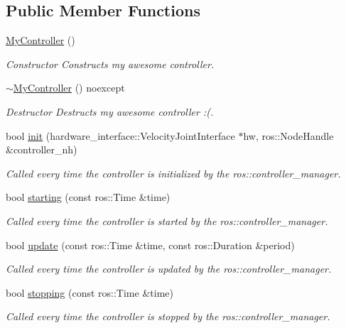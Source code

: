 \subsection*{Public Member Functions}
\begin{DoxyCompactItemize}
\item 
\hypertarget{classmycontroller_1_1MyController_a6f31f5a2318ff9e84accc3e3ce29e897}{\hyperlink{classmycontroller_1_1MyController_a6f31f5a2318ff9e84accc3e3ce29e897}{My\-Controller} ()}\label{classmycontroller_1_1MyController_a6f31f5a2318ff9e84accc3e3ce29e897}

\begin{DoxyCompactList}\small\item\em Constructor Constructs my awesome controller. \end{DoxyCompactList}\item 
\hypertarget{classmycontroller_1_1MyController_a30c609fe8c6f674a1d855bddd107f7f2}{\hyperlink{classmycontroller_1_1MyController_a30c609fe8c6f674a1d855bddd107f7f2}{$\sim$\-My\-Controller} () noexcept}\label{classmycontroller_1_1MyController_a30c609fe8c6f674a1d855bddd107f7f2}

\begin{DoxyCompactList}\small\item\em Destructor Destructs my awesome controller \-:(. \end{DoxyCompactList}\item 
bool \hyperlink{classmycontroller_1_1MyController_af9496597a461ffe70990e4a32a3d1cfd}{init} (hardware\-\_\-interface\-::\-Velocity\-Joint\-Interface $\ast$hw, ros\-::\-Node\-Handle \&controller\-\_\-nh)
\begin{DoxyCompactList}\small\item\em Called every time the controller is initialized by the ros\-::controller\-\_\-manager. \end{DoxyCompactList}\item 
bool \hyperlink{classmycontroller_1_1MyController_af16d743afe45456d6ad064d4a9e2860d}{starting} (const ros\-::\-Time \&time)
\begin{DoxyCompactList}\small\item\em Called every time the controller is started by the ros\-::controller\-\_\-manager. \end{DoxyCompactList}\item 
bool \hyperlink{classmycontroller_1_1MyController_a2839dfc2e9370ac8524b0f4e3bdd73c4}{update} (const ros\-::\-Time \&time, const ros\-::\-Duration \&period)
\begin{DoxyCompactList}\small\item\em Called every time the controller is updated by the ros\-::controller\-\_\-manager. \end{DoxyCompactList}\item 
bool \hyperlink{classmycontroller_1_1MyController_a2b7913b7eab96521a2ff14cda9afad3b}{stopping} (const ros\-::\-Time \&time)
\begin{DoxyCompactList}\small\item\em Called every time the controller is stopped by the ros\-::controller\-\_\-manager. \end{DoxyCompactList}\end{DoxyCompactItemize}


